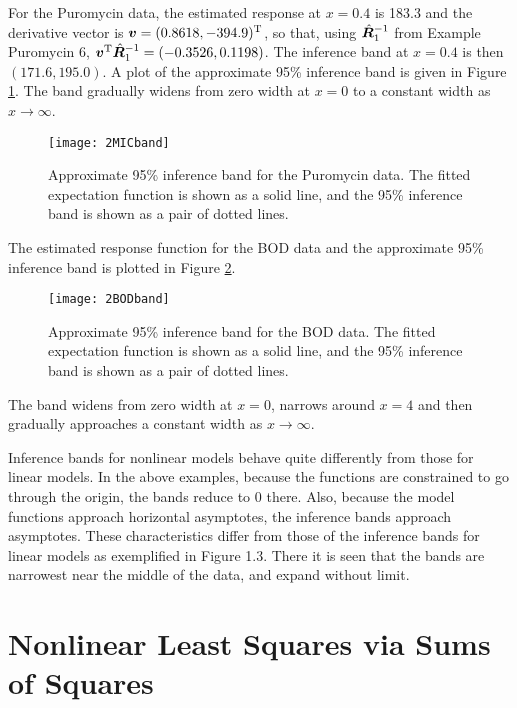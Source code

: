 \begin{example}\label{mic:9}

For the Puromycin data, the estimated response at
$x  = 0.4$ is 183.3 and the derivative vector is
$\bv = ( 0.8618 ,  -394.9 ) \trans$, so that,
using $\hat{ {\boldsymbol R}}_1^{-1}$ from Example Puromycin 6,
$ \bv \trans \hat{ \bR}_1^{-1}  = ( -0.3526,0.1198 )$.
The inference band at $x = 0.4$ is then
$(171.6,195.0)$.
A plot of the approximate 95\% inference band is given in
Figure \ref{fig:MICband}.
The band gradually widens from zero width at $x=0$ to a constant
width as $x\to\infty$.
  \begin{figure}
    \centerline{\texttt{[image: 2MICband]}}%
    \caption{\label{fig:MICband}
    Approximate 95\% inference band for the Puromycin data.
    The fitted expectation function is shown as a solid line, and the 95\%
    inference band is shown as a pair of dotted lines.
    }
  \end{figure}
\end{example}

\begin{example}\label{bod:3}

The estimated response function for the BOD data
and the approximate 95\% inference band is plotted in
Figure \ref{fig:BODband}.
  \begin{figure}
    \centerline{\texttt{[image: 2BODband]}}%
    \caption{\label{fig:BODband}
    Approximate 95\% inference band for the BOD data.
    The fitted expectation function is shown as a solid line, and the 95\%
    inference band is shown as a pair of dotted lines.
    }
  \end{figure}
The band widens from zero width at $x=0$, narrows around $x=4$ and
then gradually approaches a constant width as $x\to\infty$.
\end{example}

Inference bands for nonlinear models behave quite
differently from those for linear models.
In the above examples,
because the functions are constrained to go through the
origin, the bands reduce to 0 there.
Also, because the model functions approach horizontal asymptotes,
the inference bands approach asymptotes.
These characteristics differ from those of the inference bands
for linear models as exemplified in Figure 1.3.
There it is seen that the bands are narrowest near the middle of
the data, and expand without limit.

\section{Nonlinear Least Squares via Sums of Squares}

